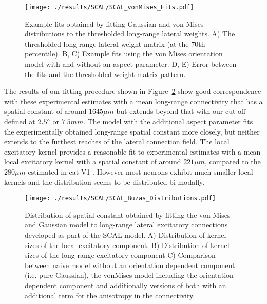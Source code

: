 \begin{figure}
	\centering
        \texttt{[image: ./results/SCAL/SCAL\_vonMises\_Fits.pdf]}
	\caption[Combined Gaussian+vonMises model fits to lateral
      connectivity of the SCAL model.]{Example fits obtained by
      fitting Gaussian and von Mises distributions to the thresholded
      long-range lateral weights. A) The thresholded long-range
      lateral weight matrix (at the 70th percentile). B, C) Example
      fits using the von Mises orientation model with and without an
      aspect parameter. D, E) Error between the fits and the
      thresholded weight matrix pattern.}
	\label{LatFits}
\end{figure}

The results of our fitting procedure shown in Figure~\ref{LatDist}
show good correspondence with these experimental estimates with a mean
long-range connectivity that has a spatial constant of around $1645
\mu m$ but extends beyond that with our cut-off defined at
$2.5\degree$ or $7.5 mm$. The model with the additional aspect
parameter fits the experimentally obtained long-range spatial constant
more closely, but neither extends to the furthest reaches of the
lateral connection field. The local excitatory kernel provides a
reasonable fit to experimental estimates with a mean local excitatory
kernel with a spatial constant of around $221 \mu m$, compared to the
$280 \mu m$ estimated in cat V1 \citep{Buzas2006}. However most
neurons exhibit much smaller local kernels and the distribution seems
to be distributed bi-modally.

\begin{figure}
	\centering
        \texttt{[image: ./results/SCAL/SCAL\_Buzas\_Distributions.pdf]}
	\caption[Distribution of spatial constants obtained by fitting
      Gaussian and vonMises model.]{Distribution of spatial constant
      obtained by fitting the \cite{Buzas2006} von Mises and Gaussian
      model to long-range lateral excitatory connections developed as
      part of the SCAL model. A) Distribution of kernel sizes of the
      local excitatory component. B) Distribution of kernel sizes of
      the long-range excitatory component C) Comparison between naive
      model without an orientation dependent component (i.e. pure
      Gaussian), the vonMises model including the orientation
      dependent component and additionally versions of both with an
      additional term for the anisotropy in the connectivity.}
	\label{LatDist}
\end{figure}

